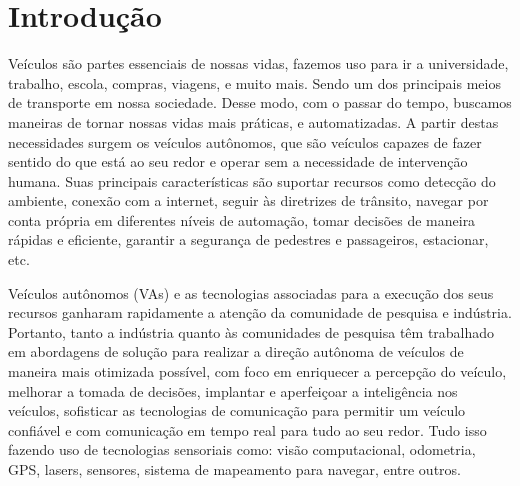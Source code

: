 \documentclass[
	12pt,				%
	openany, %
	a4paper,			%
	english,			%
	french,				%
	spanish,			%
	brazil				%
	]{abntex2}
\let\cleardoublepage\clearpage %
\begin{document}



\tableofcontents*
\cleardoublepage



\textual

\chapter*[Introdução]{Introdução}

Veículos são partes essenciais de nossas vidas, fazemos uso para ir a universidade, trabalho, escola, compras, viagens, e muito mais. Sendo um dos principais meios de transporte em nossa sociedade.
Desse modo, com o passar do tempo, buscamos maneiras de tornar nossas vidas mais práticas, e automatizadas. A partir destas necessidades surgem os veículos autônomos, que são veículos capazes de fazer sentido do que está ao seu redor e operar sem a necessidade de intervenção humana. Suas principais características são suportar recursos como detecção do ambiente, conexão com a internet, seguir às diretrizes de trânsito, navegar por conta própria em diferentes níveis de automação, tomar decisões de maneira rápidas e eficiente, garantir a segurança de pedestres e passageiros, estacionar, etc.

Veículos autônomos (VAs) e as tecnologias associadas para a execução dos seus recursos ganharam rapidamente a atenção da comunidade de pesquisa e indústria. Portanto, tanto a indústria quanto às comunidades de pesquisa têm trabalhado em abordagens de solução para realizar a direção autônoma de veículos de maneira mais otimizada possível, com foco em enriquecer a percepção do veículo, melhorar a tomada de decisões, implantar e aperfeiçoar a inteligência nos veículos, sofisticar as tecnologias de comunicação para permitir um veículo confiável e com comunicação em tempo real para tudo ao seu redor. Tudo isso fazendo uso de tecnologias sensoriais como: visão computacional, odometria, GPS, lasers, sensores, sistema de mapeamento para navegar, entre outros.
\end{document}
